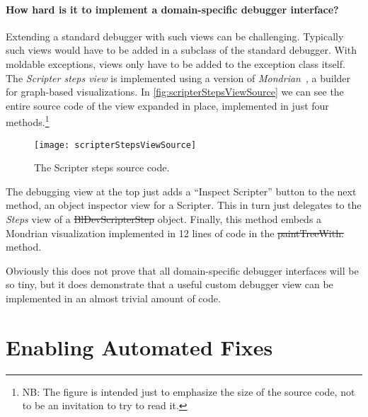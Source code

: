 \documentclass[sigplan,screen]{acmart} %
\newcommand\on[1]{\nbc{ON}{#1}{olive}} %
\newcommand\ac[1]{\nbc{AC}{#1}{teal}}
\begin{document}
\paragraph{How hard is it to implement a domain-specific debugger interface?}
Extending a standard debugger with such views can be challenging.
Typically such views would have to be added in a subclass of the standard debugger.
With moldable exceptions, views only have to be added to the exception class itself.
The \emph{Scripter steps view} is implemented using a version of \emph{Mondrian}~\cite{Pena13b,Meye06a}, a builder for graph-based visualizations.
In \autoref{fig:scripterStepsViewSource} we can see the entire source code of the view expanded in place, implemented in just four methods.\footnote{NB: The figure is intended just to emphasize the size of the source code, not to be an invitation to try to read it.}
\begin{figure}[h]
  \texttt{[image: scripterStepsViewSource]}
  \caption{The Scripter steps source code.}
  \label{fig:scripterStepsViewSource}
\end{figure}
The debugging view at the top just adds a ``Inspect Scripter'' button to the next method, an object inspector view for a Scripter.
This in turn just delegates to the \emph{Steps} view of a \st{BlDevScripterStep} object.
Finally, this method embeds a Mondrian visualization implemented in 12 lines of code in the \st{paintTreeWith:} method.

Obviously this does not prove that all domain-specific debugger interfaces will be so tiny, but it does demonstrate that a useful custom debugger view can be implemented in an almost trivial amount of code.

\section{Enabling Automated Fixes}\label{sec:fixes}

\end{document}
